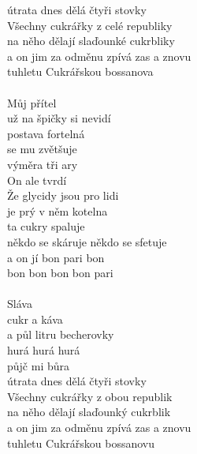 \begin{multicols}{2}
útrata dnes dělá čtyři stovky\\
Všechny cukrářky z celé republiky\\
na něho dělají slaďounké cukrbliky\\
a on jim za odměnu zpívá zas a znovu\\
tuhletu Cukrářskou bossanova\\
\\
Můj přítel\\
už na špičky si nevidí\\
postava fortelná\\
se mu zvětšuje\\
výměra tři ary\\
On ale tvrdí\\
Že glycidy jsou pro lidi\\
je prý v něm kotelna\\
ta cukry spaluje\\
někdo se skáruje někdo se sfetuje\\
a on jí bon pari bon\\
bon bon bon bon pari\\
\\
Sláva\\
cukr a káva\\
a půl litru becherovky\\
hurá hurá hurá\\
půjč mi bůra\\
útrata dnes dělá čtyři stovky\\
Všechny cukrářky z obou republik\\
na něho dělají slaďounký cukrblik\\
a on jim za odměnu zpívá zas a znovu\\
tuhletu Cukrářskou bossanovu\\
\end{multicols}